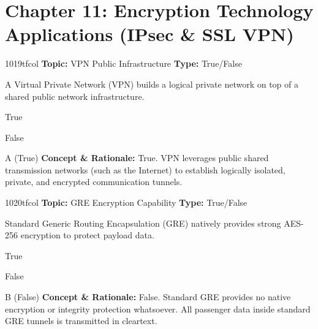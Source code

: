 \section{Chapter 11: Encryption Technology Applications (IPsec \& SSL VPN)}

\begin{qcard}{1019}{tfcol}
\textcolor{darkslate!75}{\small\textbf{Topic:} VPN Public Infrastructure \hfill \textbf{Type:} True/False}\vspace{0.4em}\par
A Virtual Private Network (VPN) builds a logical private network on top of a shared public network infrastructure.
\begin{qoptions}
\item True
\item False
\end{qoptions}
\end{qcard}
\nopagebreak
\begin{explainbox}{A (True)}
\textbf{Concept \& Rationale:} True. VPN leverages public shared transmission networks (such as the Internet) to establish logically isolated, private, and encrypted communication tunnels.
\end{explainbox}

\begin{qcard}{1020}{tfcol}
\textcolor{darkslate!75}{\small\textbf{Topic:} GRE Encryption Capability \hfill \textbf{Type:} True/False}\vspace{0.4em}\par
Standard Generic Routing Encapsulation (GRE) natively provides strong AES-256 encryption to protect payload data.
\begin{qoptions}
\item True
\item False
\end{qoptions}
\end{qcard}
\nopagebreak
\begin{explainbox}{B (False)}
\textbf{Concept \& Rationale:} False. Standard GRE provides no native encryption or integrity protection whatsoever. All passenger data inside standard GRE tunnels is transmitted in cleartext.
\end{explainbox}

